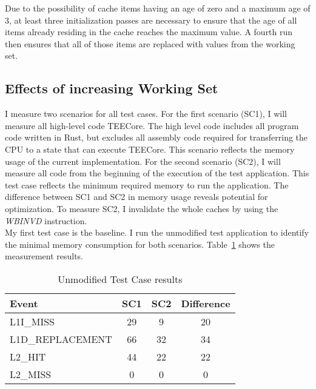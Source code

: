 Due to the possibility of cache items having an age of zero and a maximum age of
3, at least three initialization passes are necessary to ensure that the age of
all items already residing in the cache reaches the maximum value. A fourth run
then ensures that all of those items are replaced with values from the working
set.

\FloatBarrier
\subsection{Effects of increasing Working Set}
\label{eval:mem_constraints:size}

I measure two scenarios for all test cases. For the first scenario (SC1), I will
measure all high-level code TEECore. The high level code includes all program
code written in Rust, but excludes all assembly code required for transferring
the CPU to a state that can execute TEECore. This scenario reflects the memory
usage of the current implementation. For the second scenario (SC2), I will
measure all code from the beginning of the execution of the test application.
This test case reflects the minimum required memory to run the application. The
difference between SC1 and SC2 in memory usage reveals potential for
optimization. To measure SC2, I invalidate the whole caches by using the
\textit{WBINVD} instruction. \\

My first test case is the baseline. I run the unmodified test application to
identify the minimal memory consumption for both scenarios.
Table~\ref{50:tab:ping_base} shows the measurement results. 

\begin{table}[ht]
  \centering
  \begin{tabular}{ |l||c|c|c| }
    \hline
    Event            & SC1 & SC2 & Difference \\
    \hline
    L1I\_MISS        & 29  & 9   & 20         \\
    L1D\_REPLACEMENT & 66  & 32  & 34         \\
    L2\_HIT          & 44  & 22  & 22         \\
    L2\_MISS         & 0   & 0   & 0          \\
    \hline
  \end{tabular}
  \caption{Unmodified Test Case results}
  \label{50:tab:ping_base}
\end{table}


